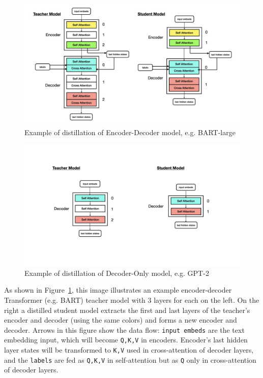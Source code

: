 \documentclass{article}
\begin{document}
    \begin{figure}[hbpt]
        \centering
        \includegraphics[width=1\textwidth]{pics/pa/0.001}
        \caption{Example of distillation of Encoder-Decoder model, e.g. BART-large}
        \label{fig:sub1}
    \end{figure}

    \begin{figure}[hbpt]
        \centering
        \includegraphics[width=1\textwidth]{pics/pa/0.002}
        \caption{Example of distillation of Decoder-Only model, e.g. GPT-2}
        \label{fig:sub2}
    \end{figure}

    \hspace*{1em} As shown in Figure~\ref{fig:sub1}, this image illustrates an example encoder-decoder Transformer (e.g. BART) teacher model with 3 layers for each on the left. On the right a distilled student model extracts the first and last layers of the teacher's encoder and decoder (using the same colors) and forms a new encoder and decoder. Arrows in this figure show the data flow: \texttt{input embeds} are the text embedding input, which will become \texttt{Q,K,V} in encoders. Encoder's last hidden layer states will be transformed to \texttt{K,V} used in cross-attention of decoder layers, and the \texttt{labels} are fed as \texttt{Q,K,V} in self-attention but as \texttt{Q} only in cross-attention of decoder layers.
\end{document}
